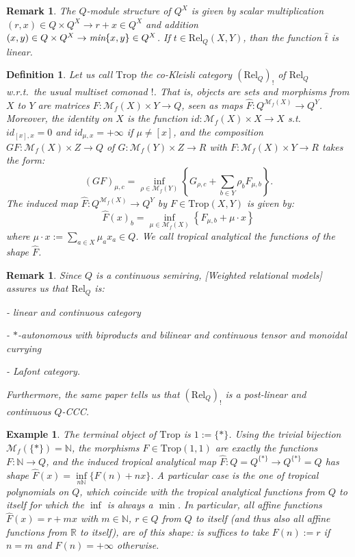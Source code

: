 \documentclass[submission,copyright,creativecommons]{eptcs}
\newtheorem{Definition}[theorem]{Definition}
\newtheorem{Example}[theorem]{Example}
\newtheorem{Remark}[theorem]{Remark}
\newcommand{\N}{\mathbb{N}}
\newcommand{\R}{\mathbb{R}}
\newcommand{\set}[1]{\{#1\}}
\newcommand{\fmsets}[1]{\mathcal{M}_f(#1)} %
\newcommand{\minimum}[2]{\emph{min}\{#1,#2\}}
\newcommand{\alarm}[1]{\color{red}#1\color{black}}
\begin{document}
\begin{Remark}
The $Q$-module structure of $Q^X$ is given by scalar multiplication $(r,x)\in Q\times Q^X\to r+x\in Q^X$ and addition $(x,y)\in Q\times Q^X\to \minimum{x}{y}\in Q^X$.
\alarm{If $t\in\mathrm{Rel}_Q(X,Y)$, than the function $\hat{t}$ is \emph{linear}}.
\end{Remark}

\begin{Definition}
Let us call $\mathrm{Trop}$ the co-Kleisli category $(\mathrm{Rel}_Q)_!$ of $\mathrm{Rel}_Q$ w.r.t.\ the usual multiset comonad $!$.
That is, objects are sets and morphisms from $X$ to $Y$ are matrices $F:\fmsets{X}\times Y\to Q$, seen as maps $\hat{F}:Q^{\fmsets{X}}\to Q^Y$.
Moreover, the identity on $X$ is the function $id:\fmsets{X}\times X\to X$ s.t.\ $id_{[x],x}=0$ and $id_{\mu,x}=+\infty$ if $\mu\neq [x]$, and the composition $GF:\fmsets{X}\times Z\to Q$ of $G:\fmsets{Y}\times Z\to R$ with $F:\fmsets{X}\times Y\to R$ takes the form:
\[
 (GF)_{\mu,c} = \inf\limits_{\rho\in\fmsets{Y}} \left\{G_{\rho,c}+\sum\limits_{b\in Y} \rho_b F_{\mu,b}\right\}.
\]
The induced map $\hat{F}:Q^{\fmsets{X}}\to Q^Y$ by $F\in\mathrm{Trop}(X,Y)$ is given by:
\[
 \hat{F}(x)_b = \inf\limits_{\mu\in\fmsets{X}} \left\{F_{\mu,b}+\mu\cdot x\right\}
\]
where $\mu\cdot x := \sum\limits_{a\in X} \mu_a x_a \in Q$.
We call \emph{tropical analytical} the functions of the shape $\hat{F}$.
\end{Definition}

\begin{Remark}
Since $Q$ is a continuous semiring, [Weighted relational models] assures us that $\mathrm{Rel}_Q$ is:

- linear and continuous category

- $*$-autonomous with biproducts and bilinear and continuous tensor and monoidal currying

- Lafont category.

Furthermore, the same paper tells us that $(\mathrm{Rel}_Q)_!$ is a post-linear and continuous $Q$-CCC.
\end{Remark}

\begin{Example}
The terminal object of $\mathrm{Trop}$ is $1:=\set{*}$.
Using the trivial bijection $\fmsets{\set{*}}= \N$, the morphisms $F\in\mathrm{Trop}(1,1)$ are \emph{exactly} the functions $F:\N\to Q$, and the induced tropical analytical map $\hat F: Q=Q^{\set{*}}\to Q^{\set{*}}=Q$ has shape $\hat{F}(x)=\inf\limits_{n\N}\set{F(n)+nx}$.
A particular case is the one of tropical polynomials on $Q$, which coincide with the tropical analytical functions from $Q$ to itself for which the $\inf$ is always a $\min$.
In particular, all affine functions $\hat F(x)=r+mx$ \emph{with $m\in\N$}, $r\in Q$ from $Q$ to itself (and thus also all affine functions from $\R$ to itself), are of this shape: is suffices to take $F(n):=r$ if $n=m$ and $F(n)=+\infty$ otherwise.
\end{Example}
\end{document}
